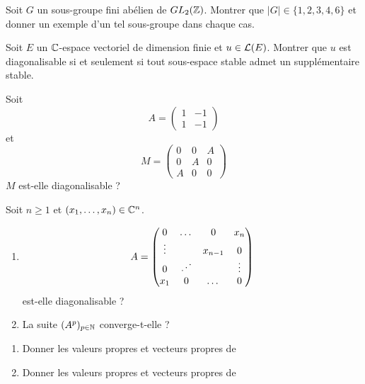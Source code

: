 \begin{exercise}
	Soit $G$ un sous-groupe fini abélien de $GL_{2}(\mathbb{Z})$. Montrer que $\vert G\vert\in\{1,2,3,4,6\}$ et donner un exemple d'un tel sous-groupe dans chaque cas.
\end{exercise}

\begin{exercise}
	Soit $E$ un $\mathbb{C}$-espace vectoriel de dimension finie et $u\in\mathcal{L}(E)$. Montrer que $u$ est diagonalisable si et seulement si tout sous-espace stable admet un supplémentaire stable.
\end{exercise}

\begin{exercise}
	Soit 
	$$
	A=
	\begin{pmatrix}
		1 & -1\\
		1 & -1
	\end{pmatrix}
	$$
	et 
	$$
	M=
	\begin{pmatrix}
		0 & 0 & A\\
		0 & A & 0\\
		A & 0 & 0
	\end{pmatrix}
	$$
	$M$ est-elle diagonalisable ?
\end{exercise}

\begin{exercise}
	Soit $n\geqslant1$ et $(x_{1},\dots,x_{n})\in\mathbb{C}^{n}$.
	\begin{enumerate}
		\item
		$$
		A=
		\begin{pmatrix}
			0 & \dots & 0 & x_{n}\\
			\vdots &  & x_{n-1} & 0\\
			0 & \reflectbox{$\ddots$} & & \vdots\\
			x_{1}& 0 &\dots & 0
		\end{pmatrix}
		$$
		est-elle diagonalisable ?
		\item La suite $(A^{p})_{p\in\mathbb{N}}$ converge-t-elle ?
	\end{enumerate}
\end{exercise}

\begin{exercise}
	\phantom{}
	\begin{enumerate}
		\item Donner les valeurs propres et vecteurs propres de 
		\item Donner les valeurs propres et vecteurs propres de 
	\end{enumerate}
\end{exercise}


